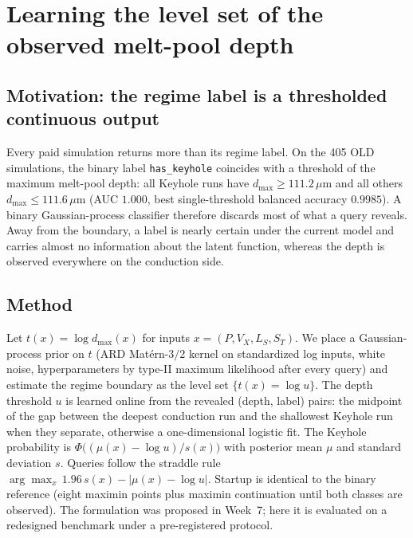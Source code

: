 \section{Learning the level set of the observed melt-pool depth}
\label{sec:depth-level-set}

\subsection{Motivation: the regime label is a thresholded continuous output}
Every paid simulation returns more than its regime label. On the 405 OLD simulations, the binary label
\texttt{has\_keyhole} coincides with a threshold of the maximum melt-pool depth: all Keyhole runs have
$d_{\max}\ge 111.2\,\mu$m and all others $d_{\max}\le 111.6\,\mu$m (AUC $1.000$, best single-threshold balanced
accuracy $0.9985$). A binary Gaussian-process classifier therefore discards most of what a query reveals. Away from
the boundary, a label is nearly certain under the current model and carries almost no information about the latent
function, whereas the depth is observed everywhere on the conduction side.

\subsection{Method}
Let $t(x)=\log d_{\max}(x)$ for inputs $x=(P,V_X,L_S,S_T)$. We place a Gaussian-process prior on $t$ (ARD Matérn-$3/2$
kernel on standardized log inputs, white noise, hyperparameters by type-II maximum likelihood after every query) and
estimate the regime boundary as the level set $\{t(x)=\log u\}$. The depth threshold $u$ is learned online from the
revealed (depth, label) pairs: the midpoint of the gap between the deepest conduction run and the shallowest Keyhole run
when they separate, otherwise a one-dimensional logistic fit. The Keyhole probability is
$\Phi\big((\mu(x)-\log u)/s(x)\big)$ with posterior mean $\mu$ and standard deviation $s$. Queries follow the straddle
rule $\arg\max_x\,1.96\,s(x)-|\mu(x)-\log u|$. Startup is identical to the binary reference (eight maximin points plus
maximin continuation until both classes are observed). The formulation was proposed in Week~7; here it is evaluated on
a redesigned benchmark under a pre-registered protocol.

